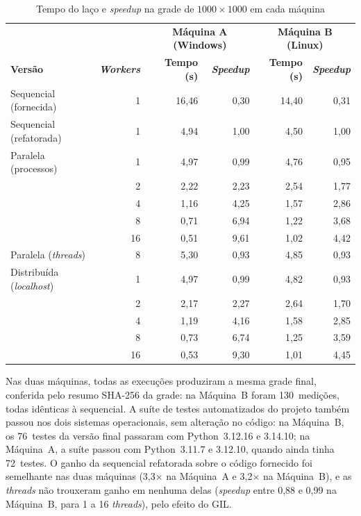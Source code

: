 \begin{table}[htb]
    \centering
    \caption{Tempo do laço e \textit{speedup} na grade de $1000 \times 1000$ em cada máquina}
    \label{tab:comparacao-maquinas}
    \begin{tabular}{lrrrrr}
        \toprule
        & & \multicolumn{2}{c}{\textbf{Máquina A (Windows)}} & \multicolumn{2}{c}{\textbf{Máquina B (Linux)}} \\
        \textbf{Versão} & \textbf{\textit{Workers}} & \textbf{Tempo (s)} & \textbf{\textit{Speedup}} & \textbf{Tempo (s)} & \textbf{\textit{Speedup}} \\
        \midrule
        Sequencial (fornecida)  & 1  & 16,46 & 0,30 & 14,40 & 0,31 \\
        Sequencial (refatorada) & 1  & 4,94  & 1,00 & 4,50  & 1,00 \\
        \midrule
        Paralela (processos)    & 1  & 4,97  & 0,99 & 4,76  & 0,95 \\
                                & 2  & 2,22  & 2,23 & 2,54  & 1,77 \\
                                & 4  & 1,16  & 4,25 & 1,57  & 2,86 \\
                                & 8  & 0,71  & 6,94 & 1,22  & 3,68 \\
                                & 16 & 0,51  & 9,61 & 1,02  & 4,42 \\
        Paralela (\textit{threads}) & 8 & 5,30 & 0,93 & 4,85 & 0,93 \\
        \midrule
        Distribuída (\textit{localhost}) & 1  & 4,97 & 0,99 & 4,82 & 0,93 \\
                                & 2  & 2,17  & 2,27 & 2,64  & 1,70 \\
                                & 4  & 1,19  & 4,16 & 1,58  & 2,85 \\
                                & 8  & 0,73  & 6,74 & 1,25  & 3,59 \\
                                & 16 & 0,53  & 9,30 & 1,01  & 4,45 \\
        \bottomrule
    \end{tabular}
    \fonte{}
\end{table}

Nas duas máquinas, todas as execuções produziram a mesma grade final, conferida pelo resumo SHA-256 da grade: na Máquina~B foram 130~medições, todas idênticas à sequencial. A suíte de testes automatizados do projeto também passou nos dois sistemas operacionais, sem alteração no código: na Máquina~B, os 76~testes da versão final passaram com Python~3.12.16 e 3.14.10; na Máquina~A, a suíte passou com Python~3.11.7 e 3.12.10, quando ainda tinha 72~testes. O ganho da sequencial refatorada sobre o código fornecido foi semelhante nas duas máquinas (3,3$\times$ na Máquina~A e 3,2$\times$ na Máquina~B), e as \textit{threads} não trouxeram ganho em nenhuma delas (\textit{speedup} entre 0,88 e 0,99 na Máquina~B, para 1 a 16 \textit{threads}), pelo efeito do \ac{GIL}.

